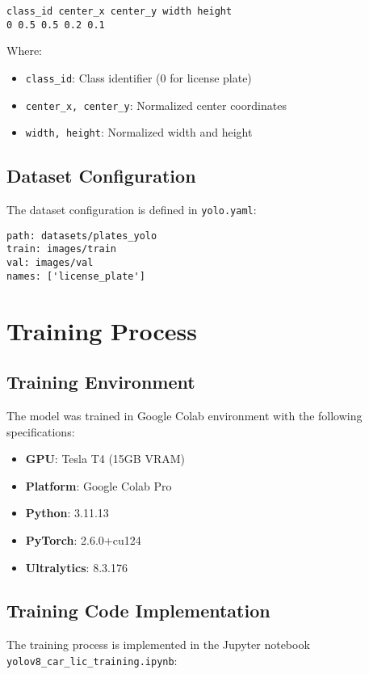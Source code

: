 \documentclass[12pt,a4paper]{article}
\begin{document}
\begin{lstlisting}[caption=YOLO Annotation Format]
class_id center_x center_y width height
0 0.5 0.5 0.2 0.1
\end{lstlisting}

Where:
\begin{itemize}
    \item \texttt{class\_id}: Class identifier (0 for license plate)
    \item \texttt{center\_x, center\_y}: Normalized center coordinates
    \item \texttt{width, height}: Normalized width and height
\end{itemize}

\subsection{Dataset Configuration}
The dataset configuration is defined in \texttt{yolo.yaml}:

\begin{lstlisting}[caption=Dataset Configuration File]
path: datasets/plates_yolo
train: images/train
val: images/val
names: ['license_plate']
\end{lstlisting}

\section{Training Process}

\subsection{Training Environment}
The model was trained in Google Colab environment with the following specifications:

\begin{itemize}
    \item \textbf{GPU}: Tesla T4 (15GB VRAM)
    \item \textbf{Platform}: Google Colab Pro
    \item \textbf{Python}: 3.11.13
    \item \textbf{PyTorch}: 2.6.0+cu124
    \item \textbf{Ultralytics}: 8.3.176
\end{itemize}

\subsection{Training Code Implementation}
The training process is implemented in the Jupyter notebook \texttt{yolov8\_car\_lic\_training.ipynb}:
\end{document}
